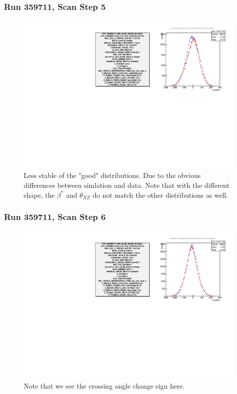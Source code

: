\begin{frame}
\frametitle{Run 359711, Scan Step 5}
\begin{figure}
\begin{center}
\includegraphics[width=\linewidth]{"figs/359711_step_5_zdc_zvertex"}
\caption{Less stable of the "good" distributions. Due to the obvious differences between simlation and data. Note that with the different shape, the $\beta^*$ and $\theta_{XZ}$ do not match the other distributions as well.}
\label{fig:359711_step_5_zdc_zvertex}
\end{center}\end{figure}
\end{frame}

\begin{frame}
\frametitle{Run 359711, Scan Step 6}
\begin{figure}
\begin{center}
\includegraphics[width=\linewidth]{"figs/359711_step_6_zdc_zvertex"}
\caption{Note that we see the crossing angle change sign here.}
\label{fig:359711_step_6_zdc_zvertex}
\end{center}\end{figure}
\end{frame}

